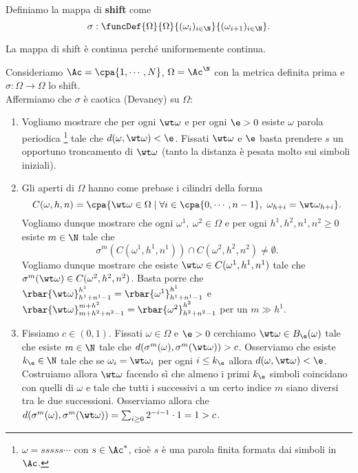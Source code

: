 \begin{definition}[Shift]
Definiamo la mappa di \textbf{shift} come
\[\sigma:\funcDef{\Omega}{\Omega}{(\omega_i)_{i\in\N}}{(\omega_{i+1})_{i\in\N}}.\]
\end{definition}
\begin{remark}
La mappa di shift \`e continua perch\'e uniformemente continua.
\end{remark}

\begin{example}
Consideriamo $\Ac=\cpa{1,\cdots, N}$, $\Omega=\Ac^\N$ con la metrica definita prima e $\sigma:\Omega\to\Omega$ lo shift.\\
Affermiamo che $\sigma$ \`e caotica (Devaney) su $\Omega$:
\begin{enumerate}
\item Vogliamo mostrare che per ogni $\wt \omega$ e per ogni $\e>0$ esiste $\omega$ parola periodica \footnote{$\omega=sssss\cdots$ con $s\in \Ac^\ast$, cio\`e $s$ \`e una parola finita formata dai simboli in $\Ac$.} tale che $d(\omega,\wt \omega)<\e$. Fissati $\wt \omega$ e $\e$ basta prendere $s$ un opportuno troncamento di $\wt \omega$ (tanto la distanza \`e pesata molto sui simboli iniziali).
\item Gli aperti di $\Omega$ hanno come prebase i cilindri della forma
\[C(\omega,h,n)=\cpa{\wt \omega\in\Omega\mid \forall i\in\cpa{0,\cdots,n-1},\ \omega_{h+i}=\wt \omega_{h+i}}.\]
Vogliamo dunque mostrare che ogni $\omega^1,\ \omega^2\in\Omega$ e per ogni $h^1,h^2,n^1,n^2\geq 0$ esiste $m\in\N$ tale che
\[\sigma^m(C(\omega^1,h^1,n^1))\cap C(\omega^2,h^2,n^2)\neq \emptyset.\]
Vogliamo dunque mostrare che esiste $\wt \omega\in C(\omega^1,h^1,n^1)$ tale che $\sigma^m(\wt \omega)\in C(\omega^2,h^2,n^2)$. Basta porre che $\rbar{\wt\omega}_{h^1+n^1-1}^{h^1}=\rbar{\omega^1}_{h^1+n^1-1}^{h^1}$ e $\rbar{\wt\omega}_{m+h^2+n^2-1}^{m+h^2}=\rbar{\omega^2}_{h^2+n^2-1}^{h^2}$ per un $m\gg h^1$.
\item Fissiamo $c\in (0,1)$. Fissati $\omega\in\Omega$ e $\e>0$ cerchiamo $\wt \omega\in B_\e(\omega)$ tale che esiste $m\in\N$ tale che $d(\sigma^m(\omega),\sigma^m(\wt \omega))>c$. Osserviamo che esiste $k_\e\in\N$ tale che se $\omega_i=\wt \omega_i$ per ogni $i\leq k_\e$ allora $d(\omega,\wt \omega)<\e$. Costruiamo allora $\wt \omega$ facendo s\`i che almeno i primi $k_\e$ simboli coincidano con quelli di $\omega$ e tale che tutti i successivi a un certo indice $m$ siano diversi tra le due successioni. Osserviamo allora che $d(\sigma^m(\omega),\sigma^m(\wt \omega))=\sum_{i\geq 0}2^{-i-1}\cdot 1=1>c$.
\end{enumerate}
\end{example}


